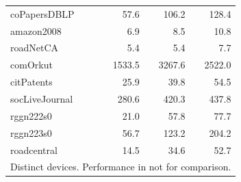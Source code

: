\begin{table}[tbp]
\begin{center}
\begin{tabular}{|l|r|r|r|}
    \rowcolor{black!2 } coPapersDBLP&57.6&106.2&128.4\\
    \rowcolor{black!10} amazon2008&6.9&8.5&10.8\\
    \rowcolor{black!2 } roadNetCA&5.4&5.4&7.7\\
    \rowcolor{black!10} comOrkut&1533.5&3267.6&2522.0\\
    \rowcolor{black!2 } citPatents&25.9&39.8&54.5\\
    \rowcolor{black!10} socLiveJournal&280.6&420.3&437.8\\
    \rowcolor{black!2 } rggn222s0&21.0&57.8&77.7\\
    \rowcolor{black!10} rggn223s0&56.7&123.2&204.2\\
    \rowcolor{black!2 } roadcentral&14.5&34.6&52.7\\
    \hline
    \hline
    \multicolumn{4}{l}{Distinct devices. Performance in not for comparison.} \\
    \end{tabular}
    \label{rq2_table}
\end{center}
\end{table}

